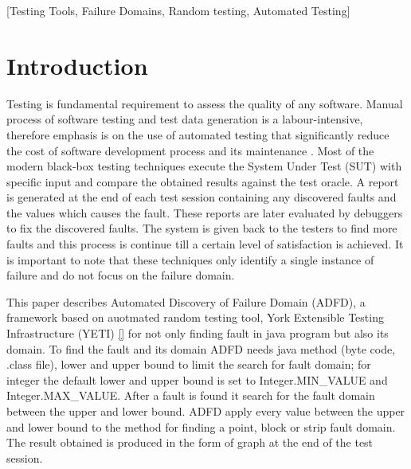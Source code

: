 \documentclass{acm_proc_article-sp}
\begin{document}
[Testing Tools, Failure Domains, Random testing, Automated Testing]

\section{Introduction}\label{sec:intro}

Testing is fundamental requirement to assess the quality of any software. Manual process of software testing and test data generation is a labour-intensive, therefore emphasis is on the use of automated testing that significantly reduce the cost of software development process and its maintenance \cite{Beizer1995}. Most of the modern black-box testing techniques  execute the System Under Test (SUT) with specific input and compare the obtained results against the test oracle. A report is generated at the end of each test session containing any discovered faults and the values which causes the fault. These reports are later evaluated by debuggers to fix the discovered faults. The system is given back to the testers to find more faults and this process is continue till a certain level of satisfaction is achieved. It is important to note that these techniques only identify a single instance of failure and do not  focus on the failure domain. 

This paper describes Automated Discovery of Failure Domain (ADFD), a framework based on auotmated random testing tool, York Extensible Testing Infrastructure (YETI) \ref{}  for not only finding fault in java program but also its domain. To find the fault and its domain ADFD needs java method (byte code, .class file), lower and upper bound to limit the search for fault domain; for integer the default lower and upper bound is set to Integer.MIN\_VALUE and Integer.MAX\_VALUE. After a fault is found it search for the fault domain between the upper and lower bound. ADFD apply every value between the upper and lower bound to the method for finding a point, block or strip fault domain. The result obtained is produced in the form of graph at the end of the test session. 

\end{document}
